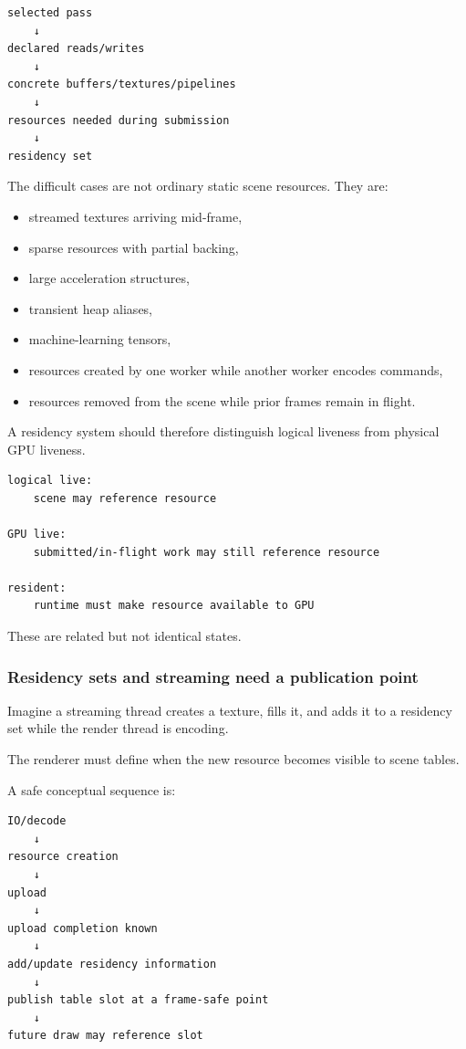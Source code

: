 \begin{verbatim}
selected pass
    ↓
declared reads/writes
    ↓
concrete buffers/textures/pipelines
    ↓
resources needed during submission
    ↓
residency set
\end{verbatim}

The difficult cases are not ordinary static scene resources. They are:

\begin{itemize}
\tightlist
\item
  streamed textures arriving mid-frame,
\item
  sparse resources with partial backing,
\item
  large acceleration structures,
\item
  transient heap aliases,
\item
  machine-learning tensors,
\item
  resources created by one worker while another worker encodes commands,
\item
  resources removed from the scene while prior frames remain in flight.
\end{itemize}

A residency system should therefore distinguish logical liveness from physical GPU liveness.

\begin{verbatim}
logical live:
    scene may reference resource

GPU live:
    submitted/in-flight work may still reference resource

resident:
    runtime must make resource available to GPU
\end{verbatim}

These are related but not identical states.

\subsubsection{Residency sets and streaming need a publication point}\label{05-engine-i-ch022-residency-sets-and-streaming-need-a-publication-point}

Imagine a streaming thread creates a texture, fills it, and adds it to a residency set while the render thread is encoding.

The renderer must define when the new resource becomes visible to scene tables.

A safe conceptual sequence is:

\begin{verbatim}
IO/decode
    ↓
resource creation
    ↓
upload
    ↓
upload completion known
    ↓
add/update residency information
    ↓
publish table slot at a frame-safe point
    ↓
future draw may reference slot
\end{verbatim}

